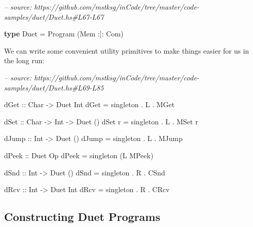 \documentclass[]{article}
\newenvironment{Shaded}{}{}
\newcommand{\CommentTok}[1]{\textcolor[rgb]{0.38,0.63,0.69}{\textit{#1}}}
\newcommand{\DataTypeTok}[1]{\textcolor[rgb]{0.56,0.13,0.00}{#1}}
\newcommand{\FunctionTok}[1]{\textcolor[rgb]{0.02,0.16,0.49}{#1}}
\newcommand{\KeywordTok}[1]{\textcolor[rgb]{0.00,0.44,0.13}{\textbf{#1}}}
\newcommand{\NormalTok}[1]{#1}
\newcommand{\OtherTok}[1]{\textcolor[rgb]{0.00,0.44,0.13}{#1}}
\begin{document}
\begin{Shaded}
\begin{Highlighting}[]
\CommentTok{-- source: https://github.com/mstksg/inCode/tree/master/code-samples/duet/Duet.hs#L67-L67}

\KeywordTok{type} \DataTypeTok{Duet} \FunctionTok{=} \DataTypeTok{Program}\NormalTok{ (}\DataTypeTok{Mem} \FunctionTok{:|:} \DataTypeTok{Com}\NormalTok{)}
\end{Highlighting}
\end{Shaded}

We can write some convenient utility primitives to make things easier for us in
the long run:

\begin{Shaded}
\begin{Highlighting}[]
\CommentTok{-- source: https://github.com/mstksg/inCode/tree/master/code-samples/duet/Duet.hs#L69-L85}

\OtherTok{dGet ::} \DataTypeTok{Char} \OtherTok{->} \DataTypeTok{Duet} \DataTypeTok{Int}
\NormalTok{dGet }\FunctionTok{=}\NormalTok{ singleton }\FunctionTok{.} \DataTypeTok{L} \FunctionTok{.} \DataTypeTok{MGet}

\OtherTok{dSet ::} \DataTypeTok{Char} \OtherTok{->} \DataTypeTok{Int} \OtherTok{->} \DataTypeTok{Duet}\NormalTok{ ()}
\NormalTok{dSet r }\FunctionTok{=}\NormalTok{ singleton }\FunctionTok{.} \DataTypeTok{L} \FunctionTok{.} \DataTypeTok{MSet}\NormalTok{ r}

\OtherTok{dJump ::} \DataTypeTok{Int} \OtherTok{->} \DataTypeTok{Duet}\NormalTok{ ()}
\NormalTok{dJump }\FunctionTok{=}\NormalTok{ singleton }\FunctionTok{.} \DataTypeTok{L} \FunctionTok{.} \DataTypeTok{MJump}

\OtherTok{dPeek ::} \DataTypeTok{Duet} \DataTypeTok{Op}
\NormalTok{dPeek }\FunctionTok{=}\NormalTok{ singleton (}\DataTypeTok{L} \DataTypeTok{MPeek}\NormalTok{)}

\OtherTok{dSnd ::} \DataTypeTok{Int} \OtherTok{->} \DataTypeTok{Duet}\NormalTok{ ()}
\NormalTok{dSnd }\FunctionTok{=}\NormalTok{ singleton }\FunctionTok{.} \DataTypeTok{R} \FunctionTok{.} \DataTypeTok{CSnd}

\OtherTok{dRcv ::} \DataTypeTok{Int} \OtherTok{->} \DataTypeTok{Duet} \DataTypeTok{Int}
\NormalTok{dRcv }\FunctionTok{=}\NormalTok{ singleton }\FunctionTok{.} \DataTypeTok{R} \FunctionTok{.} \DataTypeTok{CRcv}
\end{Highlighting}
\end{Shaded}

\hypertarget{constructing-duet-programs}{%
\subsection{Constructing Duet Programs}\label{constructing-duet-programs}}
\end{document}
